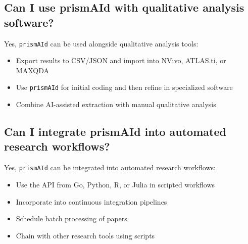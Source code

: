\subsection{Can I use prismAId with qualitative analysis software?}

Yes, \texttt{prismAId} can be used alongside qualitative analysis tools:

\begin{itemize}
    \item Export results to CSV/JSON and import into NVivo, ATLAS.ti, or MAXQDA
    \item Use \texttt{prismAId} for initial coding and then refine in specialized software
    \item Combine AI-assisted extraction with manual qualitative analysis
\end{itemize}


\subsection{Can I integrate prismAId into automated research workflows?}

Yes, \texttt{prismAId} can be integrated into automated research workflows:

\begin{itemize}
    \item Use the API from Go, Python, R, or Julia in scripted workflows
    \item Incorporate into continuous integration pipelines
    \item Schedule batch processing of papers
    \item Chain with other research tools using scripts
\end{itemize}

